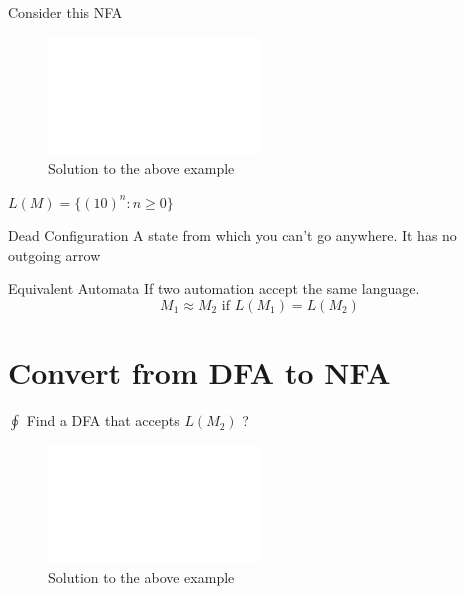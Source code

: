\begin{example}
    Consider this NFA
\end{example}

\begin{figure}[!h]
    \centering
    \includegraphics[width=0.5\textwidth]{figures/default.png}
    \caption{Solution to the above example}
\end{figure}

$L(M) = \{ (10)^n : n \geq 0\} $

\begin{definition}{Dead Configuration}
    A state from which you can't go anywhere. It has no outgoing arrow
\end{definition}

\begin{definition}{Equivalent Automata}
    If two automation accept the same language. $$
    M_1 \approx M_2 \text{ if } L(M_1) = L(M_2) $$ 
\end{definition}

\section{Convert from DFA to NFA}

$\oint$ Find a DFA that accepts $L(M_2)$ ?

\begin{figure}
    \centering
    \includegraphics[width=0.5\textwidth]{figures/default.png}
    \caption{Solution to the above example}
\end{figure}




